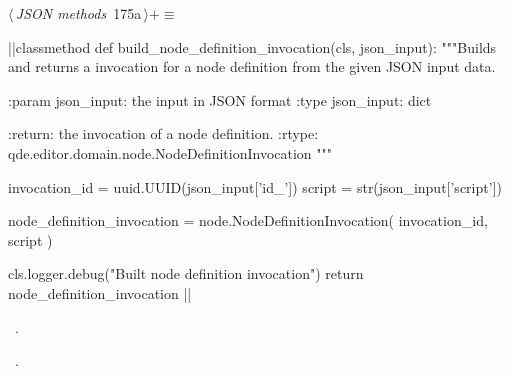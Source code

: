 \documentclass[%
    a4paper,    %
    justified,  %
    nobib,      %
    openany     %
]{tufte-book}
\begin{document}
\begin{flushleft} \small
\begin{minipage}{\linewidth}\label{scrap201}\raggedright\small
{} $\langle\,${\itshape JSON methods}\nobreak\ {\footnotesize {175a}}$\,\rangle+\equiv$
\vspace{-1ex}
\begin{pythoncode}
|\normalfont{}\fontfamily{}|classmethod
def build_node_definition_invocation(cls, json_input):
    """Builds and returns a invocation for a node definition from the given
    JSON input data.

    :param json_input: the input in JSON format
    :type  json_input: dict

    :return: the invocation of a node definition.
    :rtype:  qde.editor.domain.node.NodeDefinitionInvocation
    """

    invocation_id = uuid.UUID(json_input['id_'])
    script        = str(json_input['script'])

    node_definition_invocation = node.NodeDefinitionInvocation(
        invocation_id,
        script
    )

    cls.logger.debug("Built node definition invocation")
    return node_definition_invocation
|\NWsep|
\end{pythoncode}
\vspace{1.5ex}
\footnotesize
\begin{list}{}{\setlength{\itemsep}{-\parsep}\setlength{\itemindent}{-\leftmargin}}
\item \NWtxtMacroDefBy\ .
\item \NWtxtMacroRefIn\ .

\item{}
\end{list}
\end{minipage}\vspace{4ex}
\end{flushleft}
\end{document}

